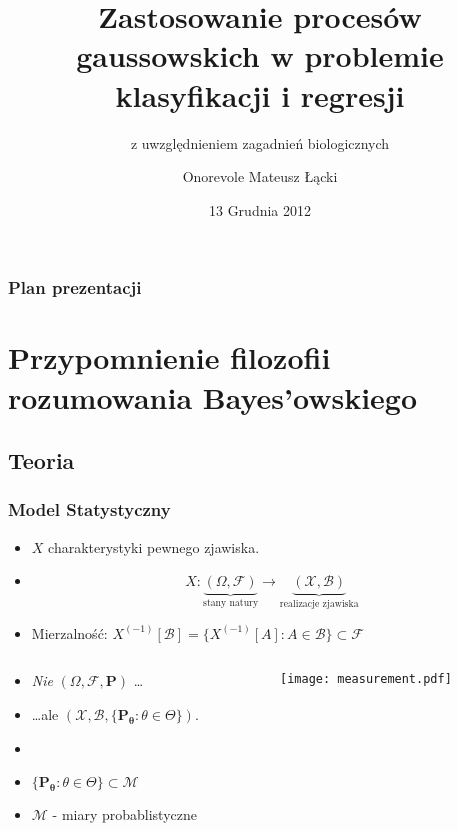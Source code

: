 \documentclass[draft, xetex]{beamer}
\title[Proces Gau\ss a]{Zastosowanie procesów gaussowskich w problemie klasyfikacji i regresji}
\subtitle{z uwzględnieniem zagadnień biologicznych}
\date{13 Grudnia 2012}
\author[Matteo]{Onorevole Mateusz Łącki}
\institute[UW]{Uniwersytet Warszawski}
\begin{document}


\begin{frame}
\titlepage
\end{frame}

\begin{frame}
	\frametitle{Plan prezentacji}
	\tableofcontents[pausesections]
\end{frame}



\section[Bayes]{Przypomnienie filozofii rozumowania Bayes'owskiego}

\subsection{Teoria}

\begin{frame}
	\frametitle{Model Statystyczny}
	
\begin{itemize}
	\item $X $ charakterystyki pewnego zjawiska.
	\item $$X: \underbrace{(\Omega, \mathcal{F})}_{\text{stany natury}}\rightarrow \underbrace{(\mathcal{X}, \mathcal{B})}_{\text{realizacje zjawiska}} $$
	\item Mierzalność: $ X^{(-1)} [ \mathcal{B}] = \{ X^{(-1)} [A] : A \in \mathcal{B} \} \subset \mathcal{F}$
\end{itemize} 	


\begin{columns}
\begin{column}[t]{5cm}
	\begin{itemize}
		\item \emph{Nie} $( \Omega, \mathcal{F}, \mathbf{P} )$ \dots
		\item \dots ale $( \mathcal{X}, \mathcal{B}, \{\mathbf{P_\theta} : \theta \in \Theta\} )$.
		\item
		\item $\{\mathbf{P_\theta} : \theta \in \Theta\} \subset \mathcal{M} $
		\item $\mathcal{M}$ - miary probablistyczne
	\end{itemize}
\end{column}
\begin{column}[t]{5cm}
	\begin{center}
		\begin{figure}
		\texttt{[image: measurement.pdf]}		
		\end{figure}
	\end{center}		
\end{column}
\end{columns}
		
\end{frame}
\end{document}

